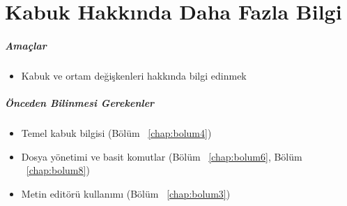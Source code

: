 \chapter{Kabuk Hakkında Daha Fazla Bilgi}
\label{chap:bolum9}
\paragraph{Amaçlar}{
\begin{itemize}
 \item Kabuk ve ortam değişkenleri hakkında bilgi edinmek
 \end{itemize}}
\paragraph{Önceden Bilinmesi Gerekenler}
\begin{itemize}
 \item Temel kabuk bilgisi (Bölüm ~\ref{chap:bolum4})
 \item Dosya yönetimi ve basit komutlar (Bölüm ~\ref{chap:bolum6}, Bölüm ~\ref{chap:bolum8})
 \item Metin editörü kullanımı (Bölüm ~\ref{chap:bolum3})
 \end{itemize}


